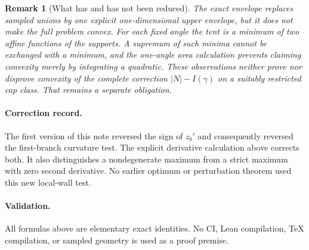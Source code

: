 \documentclass[11pt]{article}
\newtheorem{remark}{Remark}
\begin{document}
\begin{remark}[What has and has not been reduced]
The exact envelope replaces sampled unions by one explicit one-dimensional upper envelope, but it does not make the full problem convex. For each fixed angle the tent is a minimum of two affine functions of the supports. A supremum of such minima cannot be exchanged with a minimum, and the one-angle area calculation prevents claiming convexity merely by integrating a quadratic. These observations neither prove nor disprove convexity of the complete correction $|N|-I(\gamma)$ on a suitably restricted cap class. That remains a separate obligation.
\end{remark}

\paragraph{Correction record.}
The first version of this note reversed the sign of $z_b'$ and consequently reversed the first-branch curvature test. The explicit derivative calculation above corrects both. It also distinguishes a nondegenerate maximum from a strict maximum with zero second derivative. No earlier optimum or perturbation theorem used this new local-wall test.

\paragraph{Validation.}
All formulas above are elementary exact identities. No CI, Lean compilation, TeX compilation, or sampled geometry is used as a proof premise.
\end{document}
